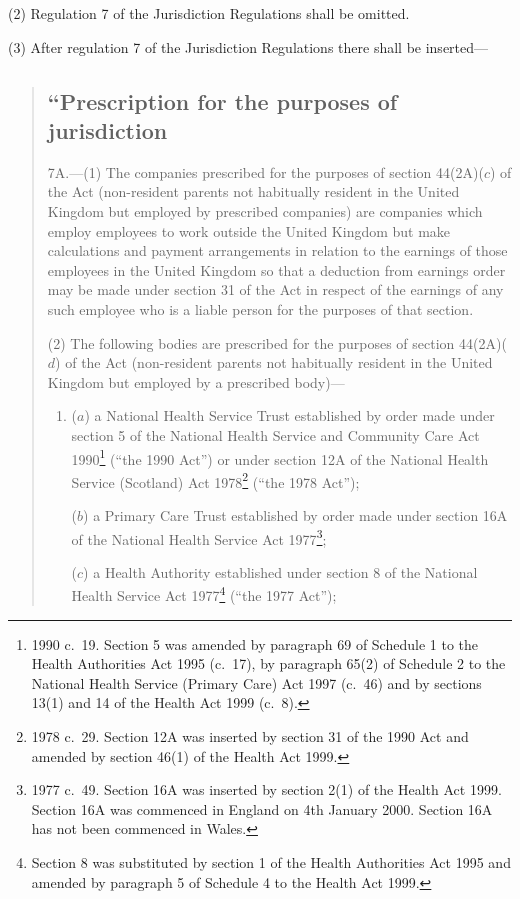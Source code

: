 \documentclass[12pt,a4paper]{article}
\begin{document}
(2) Regulation 7 of the Jurisdiction Regulations shall be omitted.

(3) After regulation 7 of the Jurisdiction Regulations there shall be inserted—
\begin{quotation}
\subsection*{“Prescription for the purposes of jurisdiction}

7A.---(1)  The companies prescribed for the purposes of section 44(2A)($c$)  of the Act (non-resident parents not habitually resident in the United Kingdom but employed by prescribed companies) are companies which employ employees to work outside the United Kingdom but make calculations and payment arrangements in relation to the earnings of those employees in the United Kingdom so that a deduction from earnings order may be made under section 31 of the Act in respect of the earnings of any such employee who is a liable person for the purposes of that section.

(2) The following bodies are prescribed for the purposes of section 44(2A)($d$)  of the Act (non-resident parents not habitually resident in the United Kingdom but employed by a prescribed body)—
\begin{enumerate}\item[]
($a$) a National Health Service Trust established by order made under section 5 of the National Health Service and Community Care Act 1990\footnote{1990 c.\ 19. Section 5 was amended by paragraph 69 of Schedule 1 to the Health Authorities Act 1995 (c.\ 17), by paragraph 65(2) of Schedule 2 to the National Health Service (Primary Care) Act 1997 (c.\ 46) and by sections 13(1) and 14 of the Health Act 1999 (c.\ 8).} (“the 1990 Act”) or under section 12A of the National Health Service (Scotland) Act 1978\footnote{1978 c.\ 29. Section 12A was inserted by section 31 of the 1990 Act and amended by section 46(1) of the Health Act 1999.} (“the 1978 Act”);

($b$) a Primary Care Trust established by order made under section 16A of the National Health Service Act 1977\footnote{1977 c.\ 49. Section 16A was inserted by section 2(1) of the Health Act 1999. Section 16A was commenced in England on 4th January 2000. Section 16A has not been commenced in Wales.};

($c$) a Health Authority established under section 8 of the National Health Service Act 1977\footnote{Section 8 was substituted by section 1 of the Health Authorities Act 1995 and amended by paragraph 5 of Schedule 4 to the Health Act 1999.} (“the 1977 Act”);


\end{enumerate}
\end{quotation}
\end{document}

